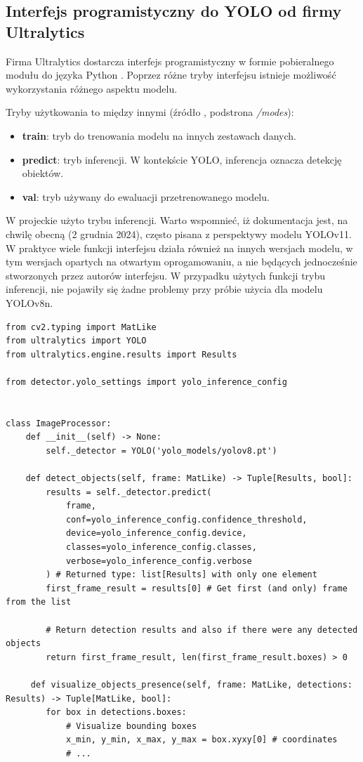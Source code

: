 \subsection{Interfejs programistyczny do YOLO od firmy Ultralytics}
\label{chap:wprowadzenie-yolo_interjes}
Firma Ultralytics dostarcza interfejs programistyczny w formie pobieralnego modułu do języka Python \cite{Python_docs}. Poprzez różne tryby interfejsu istnieje możliwość wykorzystania różnego aspektu modelu. 

Tryby użytkowania to między innymi (źródło \cite{yolo_docs}, podstrona \emph{/modes}):
\begin{itemize}
    \item \textbf{train}: tryb do trenowania modelu na innych zestawach danych.
    \item \textbf{predict}: tryb inferencji. W kontekście YOLO, inferencja oznacza detekcję obiektów.
    \item \textbf{val}: tryb używany do ewaluacji przetrenowanego modelu.
\end{itemize}

W projeckie użyto trybu inferencji. Warto wspomnieć, iż dokumentacja \cite{yolo_docs} jest, na chwilę obecną (2 grudnia 2024), często pisana z perspektywy modelu YOLOv11. W praktyce wiele funkcji interfejsu działa również na innych wersjach modelu, w tym wersjach opartych na otwartym oprogamowaniu, a nie będących jednocześnie stworzonych przez autorów interfejsu. W przypadku użytych funkcji trybu inferencji, nie pojawiły się żadne problemy przy próbie użycia dla modelu YOLOv8n. 


\begin{lstlisting}[caption={Użycie trybu inferencji na przykładzie własnego kodu źródłowego.}, label={lst:inference_interface}]
from cv2.typing import MatLike
from ultralytics import YOLO
from ultralytics.engine.results import Results

from detector.yolo_settings import yolo_inference_config


class ImageProcessor:
    def __init__(self) -> None:
        self._detector = YOLO('yolo_models/yolov8.pt')

    def detect_objects(self, frame: MatLike) -> Tuple[Results, bool]:
        results = self._detector.predict(
            frame,
            conf=yolo_inference_config.confidence_threshold,
            device=yolo_inference_config.device,
            classes=yolo_inference_config.classes,
            verbose=yolo_inference_config.verbose
        ) # Returned type: list[Results] with only one element
        first_frame_result = results[0] # Get first (and only) frame from the list

        # Return detection results and also if there were any detected objects
        return first_frame_result, len(first_frame_result.boxes) > 0 

     def visualize_objects_presence(self, frame: MatLike, detections: Results) -> Tuple[MatLike, bool]:
        for box in detections.boxes:
            # Visualize bounding boxes
            x_min, y_min, x_max, y_max = box.xyxy[0] # coordinates
            # ...
\end{lstlisting}


